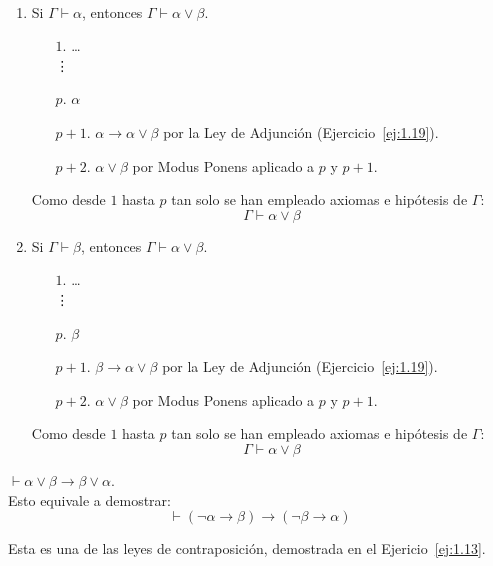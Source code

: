 \begin{ejercicio}\label{ej:1.20}~
    \begin{enumerate}
        \item Si $\Gamma \vdash \alpha$, entonces $\Gamma \vdash \alpha \lor \beta$.
        \begin{enumerate}
            \item[$1$.] \ldots\\\vdots
            \item[$p$.] $\alpha$
            \item[$p+1$.] $\alpha\rightarrow \alpha\lor\beta$ por la Ley de Adjunción (Ejercicio~\ref{ej:1.19}).
            \item[$p+2$.] $\alpha\lor\beta$ por Modus Ponens aplicado a $p$ y $p+1$.
        \end{enumerate}

        Como desde $1$ hasta $p$ tan solo se han empleado axiomas e hipótesis de $\Gamma$:
        \begin{equation*}
            \Gamma \vdash \alpha \lor \beta
        \end{equation*}
        \item Si $\Gamma \vdash \beta$, entonces $\Gamma \vdash \alpha \lor \beta$.
        \begin{enumerate}
            \item[$1$.] \ldots\\\vdots
            \item[$p$.] $\beta$
            \item[$p+1$.] $\beta\rightarrow \alpha\lor\beta$ por la Ley de Adjunción (Ejercicio~\ref{ej:1.19}).
            \item[$p+2$.] $\alpha\lor\beta$ por Modus Ponens aplicado a $p$ y $p+1$.
        \end{enumerate}
        
        Como desde $1$ hasta $p$ tan solo se han empleado axiomas e hipótesis de $\Gamma$:
        \begin{equation*}
            \Gamma \vdash \alpha \lor \beta
        \end{equation*}
    \end{enumerate}
\end{ejercicio}

\begin{ejercicio}\label{ej:1.21}
    $\vdash \alpha \lor \beta \rightarrow \beta \lor \alpha$.\\

    Esto equivale a demostrar:
    \begin{equation*}
        \vdash (\neg\alpha\rightarrow\beta)\rightarrow(\neg\beta\rightarrow\alpha)
    \end{equation*}

    Esta es una de las leyes de contraposición, demostrada en el Ejericio~\ref{ej:1.13}.
\end{ejercicio}

